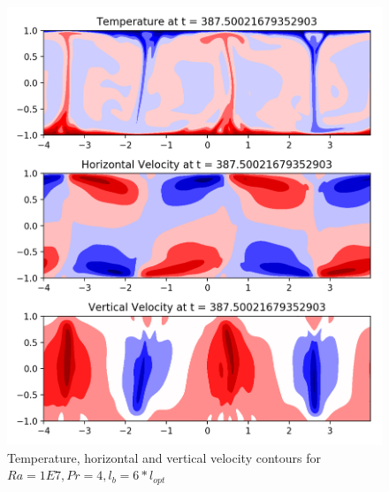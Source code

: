 \documentclass[12pt]{article}
\begin{document}
      	\begin{figure}[!htb]
      		\includegraphics[width=\linewidth]{contours_1E7_4_6.png}
      		\caption{Temperature, horizontal and vertical velocity contours for $Ra = 1E7, Pr =4, l_b = 6* l_{opt} $ }
      		\label{fig:fig9}
      	\end{figure}
\end{document}
